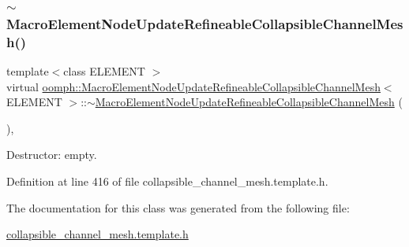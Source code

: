 \subsubsection{\texorpdfstring{$\sim$\+Macro\+Element\+Node\+Update\+Refineable\+Collapsible\+Channel\+Mesh()}{~MacroElementNodeUpdateRefineableCollapsibleChannelMesh()}}
{\footnotesize\ttfamily template$<$class E\+L\+E\+M\+E\+NT $>$ \\
virtual \hyperlink{classoomph_1_1MacroElementNodeUpdateRefineableCollapsibleChannelMesh}{oomph\+::\+Macro\+Element\+Node\+Update\+Refineable\+Collapsible\+Channel\+Mesh}$<$ E\+L\+E\+M\+E\+NT $>$\+::$\sim$\hyperlink{classoomph_1_1MacroElementNodeUpdateRefineableCollapsibleChannelMesh}{Macro\+Element\+Node\+Update\+Refineable\+Collapsible\+Channel\+Mesh} (\begin{DoxyParamCaption}{ }\end{DoxyParamCaption})\hspace{0.3cm}{\ttfamily [inline]}, {\ttfamily [virtual]}}



Destructor\+: empty. 



Definition at line 416 of file collapsible\+\_\+channel\+\_\+mesh.\+template.\+h.



The documentation for this class was generated from the following file\+:\begin{DoxyCompactItemize}
\item 
\hyperlink{collapsible__channel__mesh_8template_8h}{collapsible\+\_\+channel\+\_\+mesh.\+template.\+h}\end{DoxyCompactItemize}

